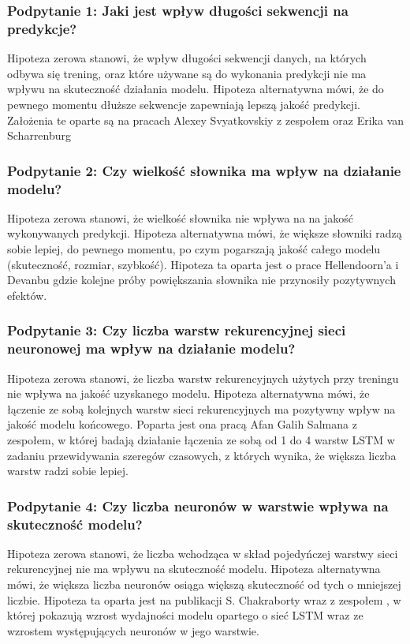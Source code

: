 \subsubsection{Podpytanie 1: Jaki jest wpływ długości sekwencji na predykcje?}
Hipoteza zerowa stanowi, że wpływ długości sekwencji danych, na których odbywa się trening, oraz które używane są do wykonania predykcji nie ma wpływu na skuteczność działania 
modelu. Hipoteza alternatywna mówi, że do pewnego momentu dłuższe sekwencje zapewniają lepszą jakość predykcji. Założenia te oparte są na pracach Alexey Svyatkovskiy z zespołem\cite{pythia}
oraz Erika van Scharrenburg \cite{erik}
\subsubsection{Podpytanie 2: Czy wielkość słownika ma wpływ na działanie modelu?}
Hipoteza zerowa stanowi, że wielkość słownika nie wpływa na na jakość wykonywanych predykcji. Hipoteza alternatywna mówi, że większe słowniki radzą sobie lepiej, do 
pewnego momentu, po czym pogarszają jakość całego modelu (skuteczność, rozmiar, szybkość). Hipoteza ta oparta jest o prace Hellendoorn'a i Devanbu \cite{hellendoorn}
gdzie kolejne próby powiększania słownika nie przynosiły pozytywnych efektów. 
\subsubsection{Podpytanie 3: Czy liczba warstw rekurencyjnej sieci neuronowej ma wpływ na działanie modelu?}
Hipoteza zerowa stanowi, że liczba warstw rekurencyjnych użytych przy treningu nie wpływa na jakość uzyskanego modelu. Hipoteza alternatywna mówi, że łączenie ze sobą 
kolejnych warstw sieci rekurencyjnych ma pozytywny wpływ na jakość modelu końcowego. Poparta jest ona pracą Afan Galih Salmana z zespołem\cite{multilstm}, w której 
badają działanie łączenia ze sobą od 1 do 4 warstw LSTM w zadaniu przewidywania szeregów czasowych, z których wynika, że większa liczba warstw radzi sobie lepiej. 
\subsubsection{Podpytanie 4: Czy liczba neuronów w warstwie wpływa na skuteczność modelu?}
Hipoteza zerowa stanowi, że liczba wchodząca w skład pojedyńczej warstwy sieci rekurencyjnej nie ma wpływu na skuteczność modelu. Hipoteza alternatywna mówi, że 
większa liczba neuronów osiąga większą skuteczność od tych o mniejszej liczbie. Hipoteza ta oparta jest na publikacji S. Chakraborty wraz z zespołem \cite{numberofunits}, 
w której pokazują wzrost wydajności modelu opartego o sieć LSTM wraz ze wzrostem występujących neuronów w jego warstwie. 
